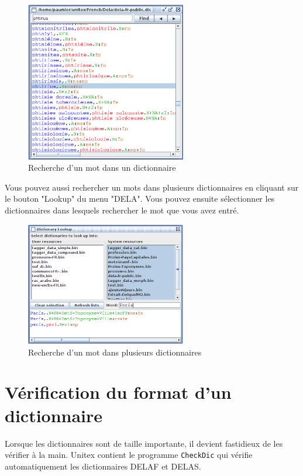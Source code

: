 \begin{figure}[h!]
\begin{center}
\includegraphics[width=7cm]{resources/img/fig3-2.png}
\caption{Recherche d'un mot dans un dictionnaire}
\end{center}
\end{figure}

\bigskip
\noindent
Vous pouvez aussi rechercher un mots dans plusieurs dictionnaires en cliquant sur le bouton "Lookup" du menu "DELA". Vous pouvez ensuite sélectionner les dictionnaires dans lesquels rechercher le mot que vous avez entré.

\begin{figure}[h!]
\begin{center}
\includegraphics[width=7cm]{resources/img/fig3-3.png}
\caption{Recherche d'un mot dans plusieurs dictionnaires}
\end{center}
\end{figure}

\bigskip
\noindent





\section{Vérification du format d’un dictionnaire}
 
Lorsque les dictionnaires sont de taille importante, il devient fastidieux de les vérifier à
la main. Unitex contient le programme \verb+CheckDic+
 qui vérifie automatiquement les dictionnaires DELAF et DELAS.

